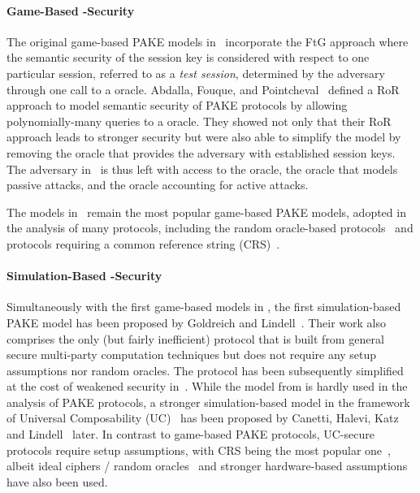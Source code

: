 \paragraph{Game-Based -Security}
The original game-based \ac{PAKE} models in~\cite{Bellare2000,Boyko2000} incorporate the \ac{FtG} approach where the semantic security of the session key is considered with respect to one particular session, referred to as a \emph{test session}, determined by the adversary through one call to a \Test oracle.
Abdalla, Fouque, and Pointcheval~\cite{Abdalla2005} defined a \ac{RoR} approach to model semantic security of PAKE protocols by allowing polynomially-many queries to a \Test oracle.
They showed not only that their \ac{RoR} approach leads to stronger security but were also able to simplify the model by removing the \Reveal oracle that provides the adversary with established session keys.
The adversary in~\cite{Abdalla2005} is thus left with access to the \Test oracle, the \Execute oracle that models passive attacks, and the \Send oracle accounting for active attacks.

The models in~\cite{Bellare2000,Abdalla2005} remain the most popular game-based PAKE models, adopted in the analysis of many protocols, including the random oracle-based protocols~\cite{Abdalla2006,Abdalla2005b} and protocols requiring a common reference string (CRS)~\cite{Gennaro2003,Gennaro2008,Katz2009a}.

\paragraph{Simulation-Based -Security}
Simultaneously with the first game-based models in \cite{Bellare2000,Boyko2000}, the first simulation-based \ac{PAKE} model has been proposed by Goldreich and Lindell~\cite{Goldreich01}.
Their work also comprises the only (but fairly inefficient) protocol that is built from general secure multi-party computation techniques but does not require any setup assumptions nor random oracles.
The protocol has been subsequently simplified at the cost of weakened security in~\cite{NguyenV04}.
While the model from \cite{Goldreich01} is hardly used in the analysis of \ac{PAKE} protocols, a stronger simulation-based model in the framework of Universal Composability (UC)~\cite{Canetti2001a} has been proposed by Canetti, Halevi, Katz and Lindell~\cite{Canetti2005} later.
In contrast to game-based \ac{PAKE} protocols, UC-secure protocols require setup assumptions, with CRS being the most popular one~\cite{Katz2011}, albeit ideal ciphers / random oracles~\cite{Abdalla2008} and stronger hardware-based assumptions~\cite{cryptoeprint:2012:537} have also been used.

